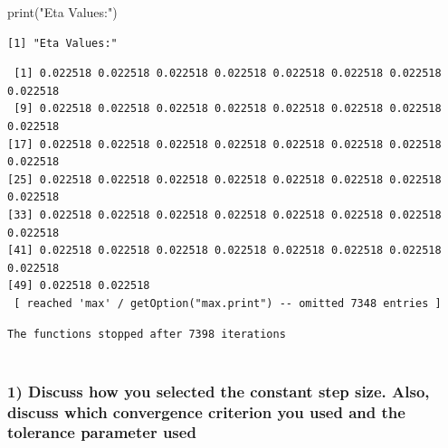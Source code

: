 \documentclass[
  letterpaper,
  DIV=11,
  numbers=noendperiod]{scrartcl}
\newenvironment{Shaded}{\begin{snugshade}}{\end{snugshade}}
\newcommand{\FunctionTok}[1]{\textcolor[rgb]{0.28,0.35,0.67}{#1}}
\newcommand{\NormalTok}[1]{\textcolor[rgb]{0.00,0.23,0.31}{#1}}
\newcommand{\SpecialCharTok}[1]{\textcolor[rgb]{0.37,0.37,0.37}{#1}}
\newcommand{\StringTok}[1]{\textcolor[rgb]{0.13,0.47,0.30}{#1}}
\begin{document}
\begin{Shaded}
\begin{Highlighting}[]
\FunctionTok{print}\NormalTok{(}\StringTok{"Eta Values:"}\NormalTok{)}
\end{Highlighting}
\end{Shaded}

\begin{verbatim}
[1] "Eta Values:"
\end{verbatim}

\begin{Shaded}
\end{Shaded}

\begin{verbatim}
 [1] 0.022518 0.022518 0.022518 0.022518 0.022518 0.022518 0.022518 0.022518
 [9] 0.022518 0.022518 0.022518 0.022518 0.022518 0.022518 0.022518 0.022518
[17] 0.022518 0.022518 0.022518 0.022518 0.022518 0.022518 0.022518 0.022518
[25] 0.022518 0.022518 0.022518 0.022518 0.022518 0.022518 0.022518 0.022518
[33] 0.022518 0.022518 0.022518 0.022518 0.022518 0.022518 0.022518 0.022518
[41] 0.022518 0.022518 0.022518 0.022518 0.022518 0.022518 0.022518 0.022518
[49] 0.022518 0.022518
 [ reached 'max' / getOption("max.print") -- omitted 7348 entries ]
\end{verbatim}

\begin{Shaded}
\end{Shaded}

\begin{verbatim}
The functions stopped after 7398 iterations 
 
\end{verbatim}

\subsubsection{1) Discuss how you selected the constant step size. Also,
discuss which convergence criterion you used and the tolerance parameter
used}\label{discuss-how-you-selected-the-constant-step-size.-also-discuss-which-convergence-criterion-you-used-and-the-tolerance-parameter-used}
\end{document}
